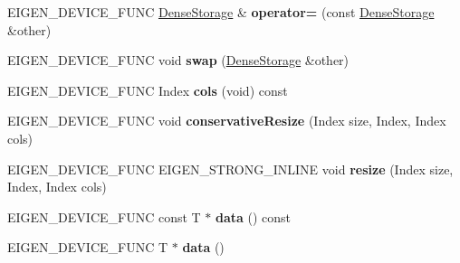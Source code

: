 \begin{DoxyCompactItemize}
E\+I\+G\+E\+N\+\_\+\+D\+E\+V\+I\+C\+E\+\_\+\+F\+U\+NC \mbox{\hyperlink{class_eigen_1_1_dense_storage}{Dense\+Storage}} \& {\bfseries operator=} (const \mbox{\hyperlink{class_eigen_1_1_dense_storage}{Dense\+Storage}} \&other)
\item 
\mbox{\label{class_eigen_1_1_dense_storage_3_01_t_00_01_dynamic_00_01___rows_00_01_dynamic_00_01___options_01_4_a2851d181efc20b98c37b6a6e9193de9c}} 
E\+I\+G\+E\+N\+\_\+\+D\+E\+V\+I\+C\+E\+\_\+\+F\+U\+NC void {\bfseries swap} (\mbox{\hyperlink{class_eigen_1_1_dense_storage}{Dense\+Storage}} \&other)
\item 
\mbox{\label{class_eigen_1_1_dense_storage_3_01_t_00_01_dynamic_00_01___rows_00_01_dynamic_00_01___options_01_4_a5b73d8339905353a4a18ec327e92bfe6}} 
E\+I\+G\+E\+N\+\_\+\+D\+E\+V\+I\+C\+E\+\_\+\+F\+U\+NC Index {\bfseries cols} (void) const
\item 
\mbox{\label{class_eigen_1_1_dense_storage_3_01_t_00_01_dynamic_00_01___rows_00_01_dynamic_00_01___options_01_4_a98f25cde6acc5e6879b30dcd48466e58}} 
E\+I\+G\+E\+N\+\_\+\+D\+E\+V\+I\+C\+E\+\_\+\+F\+U\+NC void {\bfseries conservative\+Resize} (Index size, Index, Index cols)
\item 
\mbox{\label{class_eigen_1_1_dense_storage_3_01_t_00_01_dynamic_00_01___rows_00_01_dynamic_00_01___options_01_4_ad357781295f1b942866c03c070db55b3}} 
E\+I\+G\+E\+N\+\_\+\+D\+E\+V\+I\+C\+E\+\_\+\+F\+U\+NC E\+I\+G\+E\+N\+\_\+\+S\+T\+R\+O\+N\+G\+\_\+\+I\+N\+L\+I\+NE void {\bfseries resize} (Index size, Index, Index cols)
\item 
\mbox{\label{class_eigen_1_1_dense_storage_3_01_t_00_01_dynamic_00_01___rows_00_01_dynamic_00_01___options_01_4_ada83baddd13e5201862f72e49e3242cd}} 
E\+I\+G\+E\+N\+\_\+\+D\+E\+V\+I\+C\+E\+\_\+\+F\+U\+NC const T $\ast$ {\bfseries data} () const
\item 
\mbox{\label{class_eigen_1_1_dense_storage_3_01_t_00_01_dynamic_00_01___rows_00_01_dynamic_00_01___options_01_4_ae90e587803bb63d292e28cd996416af3}} 
E\+I\+G\+E\+N\+\_\+\+D\+E\+V\+I\+C\+E\+\_\+\+F\+U\+NC T $\ast$ {\bfseries data} ()
\end{DoxyCompactItemize}
